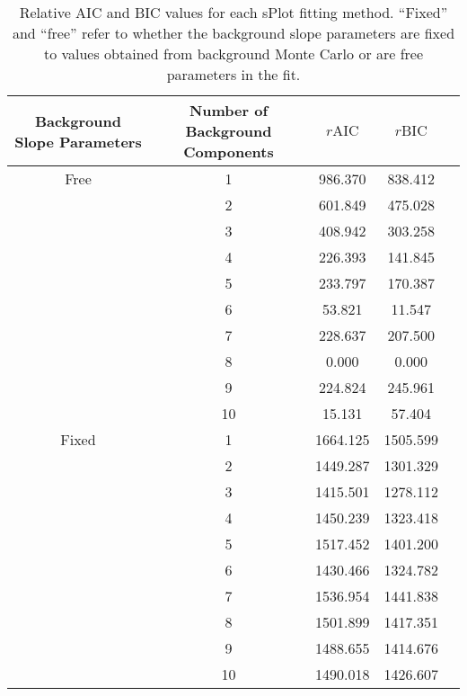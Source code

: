 \begin{table}[h]
    \begin{center}
        \begin{tabular}{ccccc}\toprule
        Background Slope Parameters & Number of Background Components & $r\text{AIC}$ & $r\text{BIC}$\\\midrule
        Free & 1 & 986.370 & 838.412 \\
         & 2 & 601.849 & 475.028 \\
         & 3 & 408.942 & 303.258 \\
         & 4 & 226.393 & 141.845 \\
         & 5 & 233.797 & 170.387 \\
         & 6 & 53.821 & 11.547 \\
         & 7 & 228.637 & 207.500 \\
         & 8 & 0.000 & 0.000 \\
         & 9 & 224.824 & 245.961 \\
         & 10 & 15.131 & 57.404 \\
        Fixed & 1 & 1664.125 & 1505.599 \\
         & 2 & 1449.287 & 1301.329 \\
         & 3 & 1415.501 & 1278.112 \\
         & 4 & 1450.239 & 1323.418 \\
         & 5 & 1517.452 & 1401.200 \\
         & 6 & 1430.466 & 1324.782 \\
         & 7 & 1536.954 & 1441.838 \\
         & 8 & 1501.899 & 1417.351 \\
         & 9 & 1488.655 & 1414.676 \\
         & 10 & 1490.018 & 1426.607 \\\bottomrule
        \end{tabular}
        \caption{Relative AIC and BIC values for each sPlot fitting method. ``Fixed'' and ``free'' refer to whether the background slope parameters are fixed to values obtained from background Monte Carlo or are free parameters in the fit.}\label{tab:splot-model-results}
    \end{center}
\end{table}